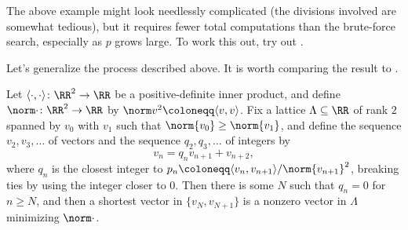 \documentclass[../notes.tex]{subfiles}
\begin{document}
The above example might look needlessly complicated (the divisions involved are somewhat tedious), but it requires fewer total computations than the brute-force search, especially as $p$ grows large. To work this out, try out .

Let's generalize the process described above. It is worth comparing the result to .
\begin{proposition} \label{prop:gauss-reduce}
	Let $\langle\cdot,\cdot\rangle\colon\RR^2\to\RR$ be a positive-definite inner product, and define $\norm\cdot\colon\RR^2\to\RR$ by $\norm v^2\coloneqq\langle v,v\rangle$. Fix a lattice $\Lambda\subseteq\RR$ of rank $2$ spanned by $v_0$ with $v_1$ such that $\norm{v_0}\ge\norm{v_1}$, and define the sequence $v_2,v_3,\ldots$ of vectors and the sequence $q_2,q_3,\ldots$ of integers by
	\[v_n=q_nv_{n+1}+v_{n+2},\]
	where $q_n$ is the closest integer to $p_n\coloneqq\langle v_n,v_{n+1}\rangle/\norm{v_{n+1}}^2$, breaking ties by using the integer closer to $0$. Then there is some $N$ such that $q_n=0$ for $n\ge N$, and then a shortest vector in $\{v_N,v_{N+1}\}$ is a nonzero vector in $\Lambda$ minimizing $\norm\cdot$.
\end{proposition}
\end{document}
